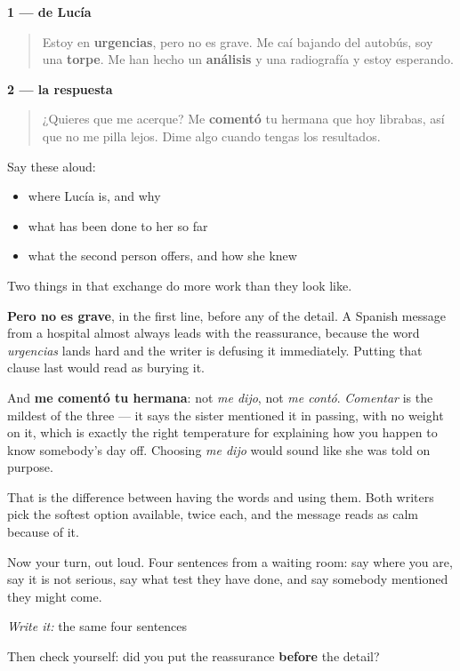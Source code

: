 \textbf{1 — de Lucía}

\begin{quote}
Estoy en \textbf{urgencias}, pero no es grave. Me caí bajando del autobús, soy una \textbf{torpe}. Me han hecho un \textbf{análisis} y una radiografía y estoy esperando.
\end{quote}

\textbf{2 — la respuesta}

\begin{quote}
¿Quieres que me acerque? Me \textbf{comentó} tu hermana que hoy librabas, así que no me pilla lejos. Dime algo cuando tengas los resultados.
\end{quote}

Say these aloud:

\begin{itemize}
\raggedright
  \item where Lucía is, and why
  \item what has been done to her so far
  \item what the second person offers, and how she knew
\end{itemize}

\begin{culture}
Two things in that exchange do more work than they look like.

\textbf{Pero no es grave}, in the first line, before any of the detail. A Spanish message from a hospital almost always leads with the reassurance, because the word \emph{urgencias} lands hard and the writer is defusing it immediately. Putting that clause last would read as burying it.

And \textbf{me comentó tu hermana}: not \emph{me dijo}, not \emph{me contó}. \emph{Comentar} is the mildest of the three — it says the sister mentioned it in passing, with no weight on it, which is exactly the right temperature for explaining how you happen to know somebody's day off. Choosing \emph{me dijo} would sound like she was told on purpose.

That is the difference between having the words and using them. Both writers pick the softest option available, twice each, and the message reads as calm because of it.
\end{culture}

\begin{tcolorbox}[breakable,colback=teal!4,colframe=teal!35!black,title={Before you move on}]
Now your turn, out loud. Four sentences from a waiting room: say where you are, say it is not serious, say what test they have done, and say somebody mentioned they might come.

\emph{Write it:} the same four sentences

Then check yourself: did you put the reassurance \textbf{before} the detail?
\end{tcolorbox}
